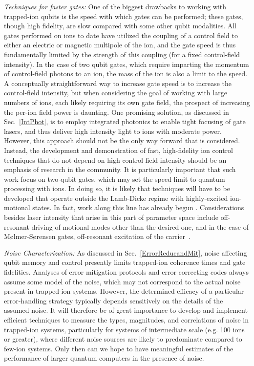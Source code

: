 \documentclass[%
reprint,
 amsmath,amssymb,
]{revtex4-1}
\begin{document}
\textit{Techniques for faster gates:} One of the biggest drawbacks to working with trapped-ion qubits is the speed with which gates can be performed; these gates, though high fidelity, are slow compared with some other qubit modalities.  All gates performed on ions to date have utilized the coupling of a control field to either an electric or magnetic multipole of the ion, and the gate speed is thus fundamentally limited by the strength of this coupling (for a fixed control-field intensity).  In the case of two qubit gates, which require imparting the momentum of control-field photons to an ion, the mass of the ion is also a limit to the speed.  A conceptually straightforward way to increase gate speed is to increase the control-field intensity, but when considering the goal of working with large numbers of ions, each likely requiring its own gate field, the prospect of increasing the per-ion field power is daunting.  One promising solution, as discussed in Sec.~\ref{IntPhot}, is to employ integrated photonics to enable tight focusing of gate lasers, and thus deliver high intensity light to ions with moderate power.  However, this approach should not be the only way forward that is considered.  Instead, the development and demonstration of fast, high-fidelity ion control techniques that do not depend on high control-field intensity should be an emphasis of research in the community.  It is particularly important that such work focus on two-qubit gates, which may set the speed limit to quantum processing with ions.  In doing so, it is likely that techniques will have to be developed that operate outside the Lamb-Dicke regime with highly-excited ion-motional states. In fact, work along this line has already begun \cite{SchaferFastIonGates2018}.  Considerations besides laser intensity that arise in this part of parameter space include off-resonant driving of motional modes other than the desired one, and in the case of M{\o}lmer-S{\o}rensen gates, off-resonant excitation of the carrier~\cite{SteanePulseGates2014}.

\textit{Noise Characterization:} As discussed in Sec.~\ref{ErrorReducandMit}, noise affecting qubit memory and control presently limits trapped-ion coherence times and gate fidelities.  Analyses of error mitigation protocols and error correcting codes always assume some model of the noise, which may not correspond to the actual noise present in trapped-ion systems.  However, the determined efficacy of a particular error-handling strategy typically depends sensitively on the details of the assumed noise.  It will therefore be of great importance to develop and implement efficient techniques to measure the types, magnitudes, and correlations of noise in trapped-ion systems, particularly for systems of intermediate scale (e.g. 100 ions or greater), where different noise sources are likely to predominate compared to few-ion systems.  Only then can we hope to have meaningful estimates of the performance of larger quantum computers in the presence of noise.
\end{document}
